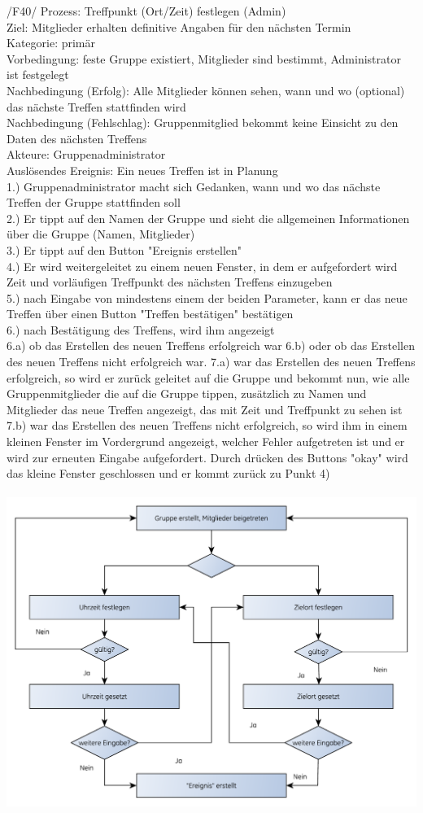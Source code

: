 /F40/ Prozess: Treffpunkt (Ort/Zeit) festlegen (Admin)\\
Ziel: Mitglieder erhalten definitive Angaben für den nächsten Termin\\
Kategorie: primär\\
Vorbedingung: feste Gruppe existiert, Mitglieder sind bestimmt, Administrator ist festgelegt\\
Nachbedingung (Erfolg): Alle Mitglieder können sehen, wann und wo (optional) das nächste Treffen stattfinden wird\\
Nachbedingung (Fehlschlag): Gruppenmitglied bekommt keine Einsicht zu den Daten des nächsten Treffens\\
Akteure: Gruppenadministrator\\
Auslösendes Ereignis: Ein neues Treffen ist in Planung\\
1.) Gruppenadministrator macht sich Gedanken, wann und wo das nächste Treffen der Gruppe stattfinden soll\\
2.) Er tippt auf den Namen der Gruppe und sieht die allgemeinen Informationen über die Gruppe (Namen, Mitglieder)\\
3.) Er tippt auf den Button "Ereignis erstellen"\\
4.) Er wird weitergeleitet zu einem neuen Fenster, in dem er aufgefordert wird Zeit und vorläufigen Treffpunkt des nächsten Treffens einzugeben\\
5.) nach Eingabe von mindestens einem der beiden Parameter, kann er das neue Treffen über einen Button "Treffen bestätigen" bestätigen\\
6.) nach Bestätigung des Treffens, wird ihm angezeigt\\
6.a) ob das Erstellen des neuen Treffens erfolgreich war
6.b) oder ob das Erstellen des neuen Treffens nicht erfolgreich war.
7.a) war das Erstellen des neuen Treffens erfolgreich, so wird er zurück geleitet auf die Gruppe und bekommt nun, wie alle Gruppenmitglieder die auf die Gruppe tippen, zusätzlich zu Namen und Mitglieder das neue Treffen angezeigt, das mit Zeit und Treffpunkt zu sehen ist\\
7.b) war das Erstellen des neuen Treffens nicht erfolgreich, so wird ihm in einem kleinen Fenster im Vordergrund angezeigt, welcher Fehler aufgetreten ist und er wird zur erneuten Eingabe aufgefordert. Durch drücken des Buttons "okay" wird das kleine Fenster geschlossen und er kommt zurück zu Punkt 4)\\ \\

\includegraphics[scale=0.8]{./res/F40_ereignis_erstellen_flowgraph.pdf}
